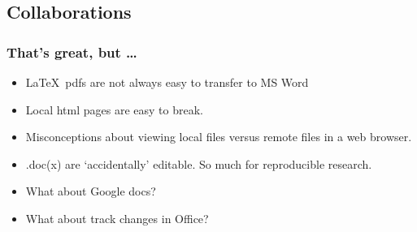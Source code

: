 \documentclass[t]{beamer}\usepackage[]{graphicx}\usepackage[]{color}
\begin{document}
\subsection{Collaborations}
\begin{frame}[fragile]
  \frametitle{That's great, but \ldots}

  \begin{itemize}
    \item \LaTeX\ pdfs are not always easy to transfer to MS Word
    \item Local html pages are easy to break.
    \item Misconceptions about viewing local files versus remote files in a web
      browser.
    \item .doc(x) are `accidentally' editable.  So much for reproducible
      research.
  \end{itemize}

  \begin{itemize}
    \item What about Google docs?
    \item What about track changes in Office?
  \end{itemize}

\end{frame}

\end{document}
